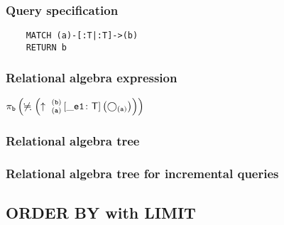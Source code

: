	\subsubsection*{Query specification}

	\begin{lstlisting}
	MATCH (a)-[:T|:T]->(b)
	RETURN b
	\end{lstlisting}


	\subsubsection*{Relational algebra expression}

	$\projection{\var{b}} \left(\alldifferent{} \left(\expandout{a}{b}{}{\_e1}{T} \left(\getvertices{a}{}\right)\right)\right)$

	\subsubsection*{Relational algebra tree}


	\subsubsection*{Relational algebra tree for incremental queries}

	\subsection{ORDER BY with LIMIT}

